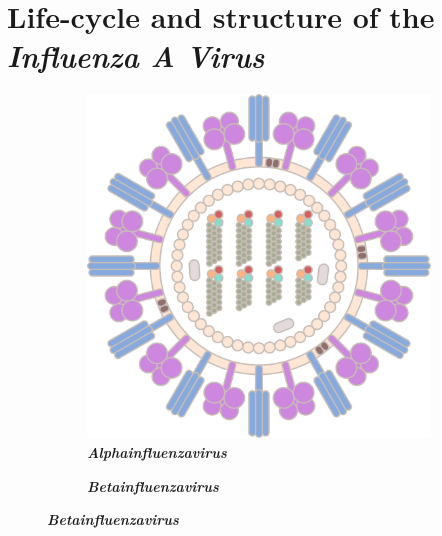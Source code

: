 \section{Life-cycle and structure of the \textit{Influenza A Virus}}

\begin{figure}
    \centering
    \begin{subfigure}[b]{0.475\textwidth}
        \caption[\textit{Alphainfluenzavirus}]{\textbf{\textit{Alphainfluenzavirus}}}
        \label{subfig:Influenza_A}
        \includegraphics[width=\textwidth]{Graphics/Influenza_A.pdf}
    \end{subfigure}
    \hfill
    \begin{subfigure}[b]{0.475\textwidth}
        \caption[\textit{Betainfluenzavirus}]{\textbf{\textit{Betainfluenzavirus}}}
        \label{subfig:Influenza_B}

\end{subfigure}
\end{figure}
